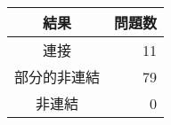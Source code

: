 \begin{tabular}{|c|r|} \hline
  結果 & 問題数 \\ \hline
  連接 & 11 \\ \hline
  部分的非連結 & 79 \\ \hline
  非連結 & 0 \\ \hline
\end{tabular}